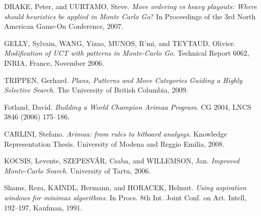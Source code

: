 \begin{thebibliography}{99}
	{\sc DRAKE,} Peter, and {\sc UURTAMO,} Steve.
	\emph{Move ordering vs heavy playouts: Where should heuristics be applied
	in Monte Carlo Go}?
	In Proceedings of the 3rd North American Game-On Conference, 2007.

	{\sc GELLY,} Sylvain, {\sc WANG,} Yizao, {\sc MUNOS,} R'mi, and {\sc
	TEYTAUD,} Olivier.
	\emph{Modification of UCT with patterns in Monte-Carlo Go}.
	Technical Report 6062, INRIA, France, November 2006.

	{\sc TRIPPEN,} Gerhard.
	\emph{Plans, Patterns and Move Categories Guiding a Highly Selective Search}.
	The University of British Columbia, 2009.

	{\sc Fotland,} David.
	\emph{Building a World Champion Arimaa Program}.
	CG 2004, LNCS 3846 (2006) 175--186.

	{\sc CARLINI,} Stefano.
	\emph{Arimaa: from rules to bitboard analysys}.
	Knowledge Representation Thesis.
	University of Modena and Reggio Emilia, 2008.

	{\sc KOCSIS,} Levente, {\sc SZEPESVÁR,} Csaba, and {\sc WILLEMSON,} Jan.
	\emph{Improved Monte-Carlo Search}.
	University of Tartu, 2006.

	{\sc Shams,} Reza, {\sc KAINDL,} Hermann, and {\sc HORACEK,} Helmut.
	\emph{Using aspiration windows for minimax algorithms}.
	In Procs. 8th Int. Joint Conf. on Art. Intell, 192--197, Kaufman, 1991.

\end{thebibliography}

